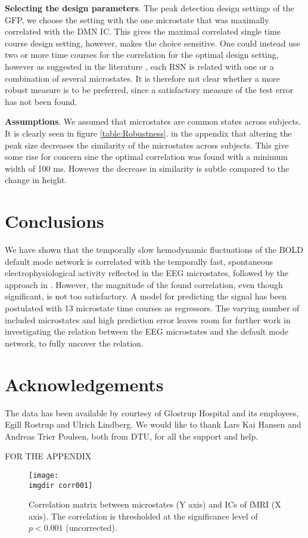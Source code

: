 \documentclass{article}
\newcommand{\imgdir}{Images/} %
\begin{document}
\textbf{Selecting the design parameters}. The peak detection design settings of the GFP, we choose the setting with the one microstate that was maximally correlated with the DMN IC. This gives the maximal correlated single time course design setting, however, makes the choice sensitive. One could instead use two or more time courses for the correlation for the optimal design setting, however as suggested in the literature \cite{Yuan20122062}, each RSN is related with one or a combination of several microstates. It is therefore not clear whether a more robust measure is to be preferred, since a satisfactory measure of the test error has not been found.

\textbf{Assumptions}. We assumed that microstates are common states across subjects. It is clearly seen in figure \ref{table:Robustness}. in the appendix that altering the peak size decreases the similarity of the microstates across subjects. This give some rise for concern sine the optimal correlation was found with a minimum width of 100 ms. However the decrease in similarity is subtle compared to the change in height.


\section{Conclusions}
We have shown that the temporally slow hemodynamic fluctuations of the BOLD default mode network is correlated with the temporally fast, spontaneous electrophysiological activity reflected in the EEG microstates, followed by the approach in \cite{Yuan20122062}. However, the magnitude of the found correlation, even though significant, is not too satisfactory. A model for predicting the signal has been postulated with 13 microstate time courses as regressors. The varying number of included microstates and high prediction error leaves room for further work in investigating the relation between the EEG microstates and the default mode network, to fully uncover the relation.

\section{Acknowledgements}
The data has been available by courtesy of Glostrup Hospital and its employees, Egill Rostrup and Ulrich Lindberg. We would like to thank Lars Kai Hansen and
Andreas Trier Poulsen, both from DTU, for all the support and help.



\newpage
FOR THE APPENDIX
\begin{figure}[!ht]
    \centering
    \texttt{[image: \\imgdir corr001]}
    \caption{Correlation matrix between microstates (Y axis) and ICs of fMRI (X axis). The correlation is thresholded at the significance level of $p<0.001$ (uncorrected).}
    \label{fig:corr001}
\end{figure}
\end{document}
